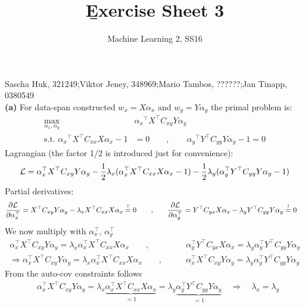 \documentclass[a4paper]{article}
\DeclareMathOperator*{\argmax}{arg\,max}
\newcommand{\eqq}{  \overset{\text{!}}{=} }
\newcommand{\Yt}{{Y^\top}}
\newcommand{\Xt}{{X^\top}}
\newcommand{\lx}{{\lambda_{x}}}
\newcommand{\ly}{{\lambda_{y}}}
\newcommand{\ax}{{\alpha_{x}}}
\newcommand{\ay}{{\alpha_{y}}}
\newcommand{\axt}{\alpha_{x}^\top}
\newcommand{\ayt}{\alpha_{y}^\top}
\newcommand{\Cxx}{C_{xx}}
\newcommand{\Cxy}{C_{xy}}
\newcommand{\Cyx}{C_{yx}}
\newcommand{\Cyy}{C_{yy}}
\newcommand{\1}{\mathds{1}}
\newcommand{\lag}{\mathcal{L}}
\begin{document}
\title{\b{Exercise Sheet 3}}
\author{Machine Learning 2, SS16}

\maketitle

Sascha Huk, 321249;\quad Viktor Jeney, 348969;\quad Mario Tambos, ??????;\quad Jan Tinapp, 0380549\\


 
\textbf{(a)}
For data-span constructed $w_x = X\ax$ and $w_y = Y\ay$ the primal problem is:  
\begin{align*}
	\max_{\ax,\ay} &\ax^\top X^\top C_{xy} Y\ay \\ 
	\text{s.t. } \ax^\top X^\top C_{xx} X\ax - 1 &= 0 
	\quad\quad ,\quad\quad
	 \ay^\top Y^\top C_{yy} Y\ay - 1 = 0
\end{align*}
Lagrangian (the factor 1/2 is introduced just for convenience):
\begin{align*}
	\mathcal{L}=\axt\Xt\Cxy Y\ay - {1\over 2}\lx(\axt\Xt\Cxx X\ax - 1)
	- {1\over 2}\ly(\ayt\Yt\Cyy Y\ay - 1)
\end{align*}
Partial derivatives:
\begin{align*}
	{\partial\lag\over\partial\axt} = \Xt\Cxy Y\ay - \lx\Xt\Cxx X\ax \eqq 0
	\quad\quad ,&\quad\quad
	{\partial\lag\over\partial\ayt} = \Yt\Cyx X\ax - \ly\Yt\Cyy Y\ay \eqq 0
\end{align*}
We now multiply with $\axt$, $\ayt$
\begin{align*}
	\axt\Xt\Cxy Y\ay = \lx\axt\Xt\Cxx X\ax
	\quad\quad ,&\quad\quad
	\ayt\Yt\Cyx X\ax = \ly\ayt\Yt\Cyy Y\ay
	\\
	\Longrightarrow
	\axt\Xt\Cxy Y\ay = \lx\axt\Xt\Cxx X\ax
	\quad\quad ,&\quad\quad
	\axt\Xt\Cxy Y\ay = \ly\ayt\Yt\Cyy Y\ay	
\end{align*}
From the auto-cov constraints follows
\begin{align*}
	&\axt\Xt\Cxy Y\ay = \lx\underbrace{\axt\Xt\Cxx X\ax}_{=1} 
	= \ly\underbrace{\ayt\Yt\Cyy Y\ay}_{=1}
	\quad \Longrightarrow \quad \lx = \ly
\end{align*}
\end{document}

